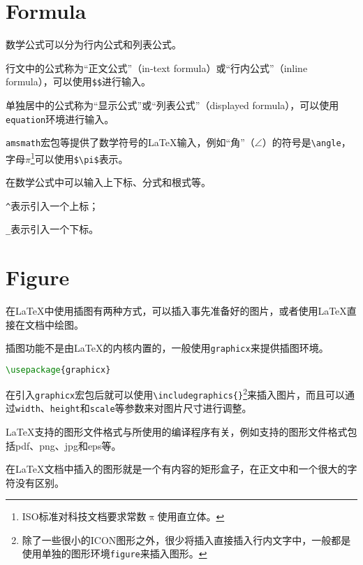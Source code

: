 \chapter{Formula}

数学公式可以分为行内公式和列表公式。

\begin{compactitem}
\item 行文中的公式称为“正文公式”（in-text formula）或“行内公式”（inline formula），可以使用\texttt{\$\$}进行输入。
\item 单独居中的公式称为“显示公式”或“列表公式”（displayed formula），可以使用\texttt{equation}环境进行输入。
\end{compactitem}

\texttt{amsmath}宏包等提供了数学符号的\LaTeX 输入，例如“角”（$\angle$）的符号是\texttt{\textbackslash angle}，字母$\pi$\footnote{ISO标准对科技文档要求常数$\uppi$使用直立体。}可以使用\texttt{\$\textbackslash pi\$}表示。

在数学公式中可以输入上下标、分式和根式等。

\begin{compactitem}
\item \texttt{\^{}}表示引入一个上标；
\item \texttt{\_}表示引入一个下标。
\end{compactitem}


\chapter{Figure}

在\LaTeX 中使用插图有两种方式，可以插入事先准备好的图片，或者使用\LaTeX 直接在文档中绘图。

插图功能不是由\LaTeX 的内核内置的，一般使用\texttt{graphicx}来提供插图环境。

\begin{lstlisting}[language=TeX]
\usepackage{graphicx}
\end{lstlisting}

在引入\texttt{graphicx}宏包后就可以使用\texttt{\textbackslash includegraphics\{\}}\footnote{除了一些很小的ICON图形之外，很少将插入直接插入行内文字中，一般都是使用单独的图形环境\texttt{figure}来插入图形。}来插入图片，而且可以通过\texttt{width}、\texttt{height}和\texttt{scale}等参数来对图片尺寸进行调整。

\LaTeX 支持的图形文件格式与所使用的编译程序有关，例如\XeLaTeX 支持的图形文件格式包括pdf、png、jpg和eps等。

在\LaTeX 文档中插入的图形就是一个有内容的矩形盒子，在正文中和一个很大的字符没有区别。

